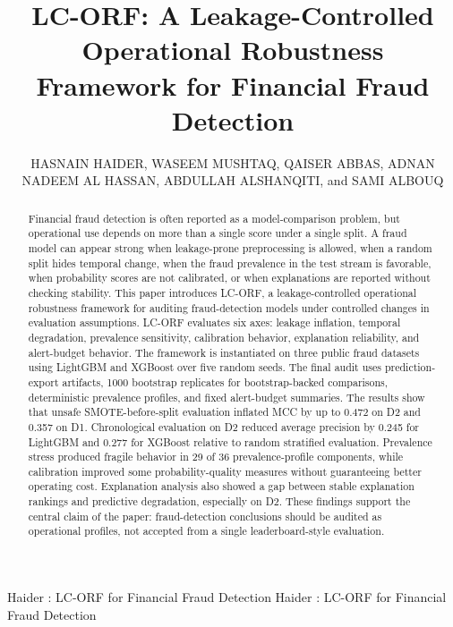 \documentclass{ieeeaccess}
\begin{document}
\title{LC-ORF: A Leakage-Controlled Operational Robustness Framework for Financial Fraud Detection}

\author{\uppercase{Hasnain Haider},
\uppercase{Waseem Mushtaq},
\uppercase{Qaiser Abbas},
\uppercase{Adnan Nadeem Al Hassan},
\uppercase{Abdullah Alshanqiti}, and
\uppercase{Sami Albouq}}

\address[1]{School of Computing and Informatics, Albukhary International University, Alor Setar, Kedah, Malaysia (e-mail: hasnain.haider@student.aiu.edu.my; waseem.mushtaq@student.aiu.edu.my)}
\address[2]{Faculty of Computer and Information Systems, Islamic University of Madinah, Madinah 42351, Saudi Arabia (e-mail: salbouq1@iu.edu.sa)}

\markboth
{Haider \headeretal: LC-ORF for Financial Fraud Detection}
{Haider \headeretal: LC-ORF for Financial Fraud Detection}


\begin{abstract}
Financial fraud detection is often reported as a model-comparison problem, but operational use depends on more than a single score under a single split. A fraud model can appear strong when leakage-prone preprocessing is allowed, when a random split hides temporal change, when the fraud prevalence in the test stream is favorable, when probability scores are not calibrated, or when explanations are reported without checking stability. This paper introduces LC-ORF, a leakage-controlled operational robustness framework for auditing fraud-detection models under controlled changes in evaluation assumptions. LC-ORF evaluates six axes: leakage inflation, temporal degradation, prevalence sensitivity, calibration behavior, explanation reliability, and alert-budget behavior. The framework is instantiated on three public fraud datasets using LightGBM and XGBoost over five random seeds. The final audit uses prediction-export artifacts, 1000 bootstrap replicates for bootstrap-backed comparisons, deterministic prevalence profiles, and fixed alert-budget summaries. The results show that unsafe SMOTE-before-split evaluation inflated MCC by up to 0.472 on D2 and 0.357 on D1. Chronological evaluation on D2 reduced average precision by 0.245 for LightGBM and 0.277 for XGBoost relative to random stratified evaluation. Prevalence stress produced fragile behavior in 29 of 36 prevalence-profile components, while calibration improved some probability-quality measures without guaranteeing better operating cost. Explanation analysis also showed a gap between stable explanation rankings and predictive degradation, especially on D2. These findings support the central claim of the paper: fraud-detection conclusions should be audited as operational profiles, not accepted from a single leaderboard-style evaluation.
\end{abstract}
\end{document}
